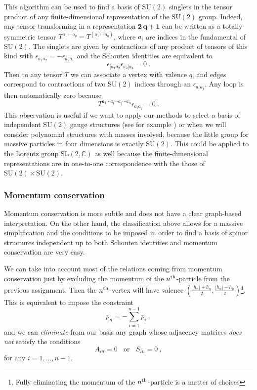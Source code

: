 \documentclass[aps,prd,nofootinbib,twocolumn,10pt]{revtex4-2}
\begin{document}
This algorithm can be used to find a basis of $\mathrm{SU}(2)$ singlets in the tensor product of any finite-dimensional representation of the $\mathrm{SU}(2)$ group. Indeed, any tensor transforming in a representation $\mathbf{2\, q+1}$ can be written as a totally-symmetric tensor $T^{a_1\, \cdots \, a_q} = T^{(a_1\, \cdots \, a_q)}$, where $a_i$ are indices in the fundamental of $\mathrm{SU}(2)$. The singlets are given by contractions of any product of tensors of this kind with $\epsilon_{a_1 a_2} = - \epsilon_{a_2 a_1}$ and the Schouten identities are equivalent to
\begin{equation}
	\epsilon_{[a_1 a_2} \epsilon_{a_3] a_4} = 0\ .
\end{equation}
Then to any tensor $T$ we can associate a vertex with valence $q$, and edges correspond to contractions of two $\mathrm{SU}(2)$ indices through an $\epsilon_{a_i a_j}$. Any loop is then automatically zero because
\begin{equation}
	T^{a_1 \cdots a_i \cdots a_j \cdots a_n} \epsilon_{a_i a_j} = 0\ .
\end{equation}
This observation is useful if we want to apply our methods to select a basis of independent $\mathrm{SU}(2)$ gauge structures (see for example \cite{Huber:2021vnc}) or when we will consider polynomial structures with masses involved, because the little group for massive particles in four dimensions is exactly $\mathrm{SU}(2)$. This could be applied to the Lorentz group $\mathrm{SL}(2,\mathbb{C})$ as well because the finite-dimensional representations are in one-to-one correspondence with the those of $\mathrm{SU}(2)\times \mathrm{SU}(2)$.

\subsubsection{Momentum conservation}

Momentum conservation is more subtle and does not have a clear graph-based interpretation. On the other hand, the classification above allows for a massive simplification and the conditions to be imposed in order to find a basis of spinor structures independent up to both Schouten identities and momentum conservation are very easy.


We can take into account most of the relations coming from momentum conservation just by excluding the momentum of the $n^{\rm th}$-particle from the previous assignment. Then the $n^{\rm th}$-vertex will have valence $(\frac{|h_n|+h_n}{2},\frac{|h_n|-h_n}{2})$\footnote{Fully eliminating the momentum of the $n^{\rm th}$-particle is a matter of choices}. This is equivalent to impose the constraint
\begin{equation}
	p_n = - \sum_{i = 1}^{n-1} p_i\ ,
\end{equation}
and we can \textit{eliminate} from our basis any graph whose adjacency matrices \textit{does not} satisfy the conditions
\begin{equation}
	A_{i n} = 0 \ \ \ \ \mathrm{or}\ \ \ \ S_{i n} = 0\ ,
\end{equation}
for any $i=1,\dots , n-1$.
\end{document}
